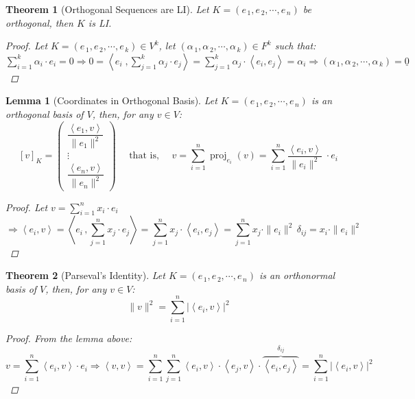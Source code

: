 \documentclass[12pt]{article}
\let\RA\Rightarrow
\newcommand{\tuple}[1]{\underline{#1}}
\newcommand{\seq}[2]{\left({#1}_{\,1},{#1}_{\,2},\cdots,{#1}_{\,#2}\right)}
\newcommand{\inner}[2]{\left\langle{#1},{#2}\right\rangle}
\DeclareMathOperator{\proj}{proj}
\newtheorem{theorem}{Theorem}[subsection]
\newtheorem{lemma}{Lemma}[subsection]
\begin{document}
\begin{theorem}[Orthogonal Sequences are LI]
  Let $K=\seq{e}{n}$ be orthogonal, then $K$ is LI.
  \begin{proof}
    Let $K=\seq{e}{k}\in V^k$, let $\seq{\alpha}{k}\in F^k$ such that: $\displaystyle\sum_{i=1}^k \alpha_i\cdot e_i=0\RA 0=\inner{e_i\;}{\sum_{j=1}^k \alpha_j\cdot e_j}=\sum_{j=1}^k \alpha_j\cdot \inner{e_i}{e_j}=\alpha_i \RA \seq{\alpha}{k}=\tuple{0}$
  \end{proof}
\end{theorem}

\begin{lemma}[Coordinates in Orthogonal Basis]
  Let $K=\seq{e}{n}$ is an orthogonal basis of $V$, then, for any $v\in V$:
  $$
  [v]_K=\begin{pmatrix}
    \dfrac{\inner{e_1}{v}}{\|e_1\|^2}\\
    \vdots\\
    \dfrac{\inner{e_n}{v}}{\|e_n\|^2}
  \end{pmatrix}\quad\text{ that is, }\quad v=\sum_{i=1}^n \proj_{e_i}(v)=\sum_{i=1}^n \dfrac{\inner{e_i}{v}}{\|e_i\|^2}\;\cdot e_i
  $$
  \begin{proof}
    Let $\displaystyle v=\sum_{i=1}^n x_i\cdot e_i$ $$\RA \inner{e_i}{v}=\inner{e_i\,}{\sum_{j=1}^n x_j\cdot e_j}=\sum_{j=1}^n x_j\cdot \inner{e_i}{e_j}=\sum_{j=1}^n x_j\cdot\|e_i\|^2\,\delta_{ij}= x_i\cdot \|e_i\|^2$$
  \end{proof}
\end{lemma}

\begin{theorem}[Parseval's Identity]
  Let $K=\seq{e}{n}$ is an orthonormal basis of $V$, then, for any $v\in V$: $$\|v\|^2=\sum_{i=1}^n |\inner{e_i}{v}|^2$$
  \begin{proof}
    From the lemma above: $$v=\sum_{i=1}^n \inner{e_i}{v}\cdot e_i\RA \inner{v}{v}=\sum_{i=1}^n\sum_{j=1}^n \inner{e_i}{v}\cdot \inner{e_j}{v}\cdot \overbrace{\inner{e_i}{e_j}}^{\delta_{ij}}=\sum_{i=1}^n |\inner{e_i}{v}|^2$$
  \end{proof}
\end{theorem}
\end{document}
